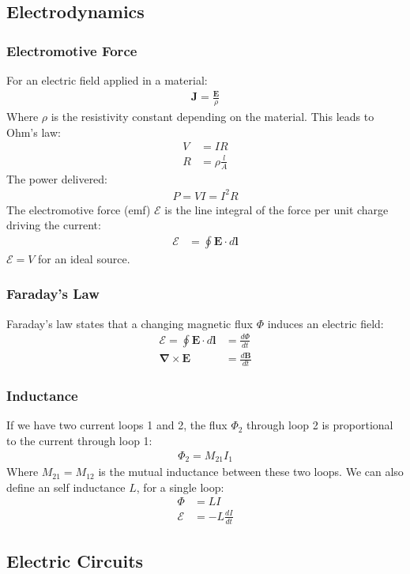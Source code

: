 \documentclass[11pt]{article}
\newcommand{\emf}{\mathcal{E}}	%
\newcommand{\ve}[1]{
  \ensuremath{\bm{#1}}}	               %
\begin{document}
\begin{multicols*}{3}
\subsection{Electrodynamics}
\subsubsection{Electromotive Force}
For an electric field applied in a material:
\begin{align*}
\ve{J} = \frac{\ve{E}}{\rho}
\end{align*}
Where $\rho$ is the resistivity constant depending on the material.
This leads to Ohm's law:
\begin{align*}
V&=IR\\
R&=\rho\frac{l}{A}
\end{align*}
The power delivered:
\begin{align*}
P=VI=I^2R
\end{align*}
The electromotive force (emf) $\emf$ is the line integral of the force per unit charge driving the current:
\begin{align*}
\emf &=\oint \ve{E} \cdot d\ve{l}
\end{align*}
$\emf=V$ for an ideal source.
\subsubsection{Faraday's Law}
Faraday's law states that a changing magnetic flux $\Phi$ induces an electric field:
\begin{align*}
\emf =\oint \ve{E} \cdot d\ve{l} &= \frac{d\Phi}{dt}\\
\ve{\nabla}\times\ve{E}&=\frac{d\ve{B}}{dt}
\end{align*}
\subsubsection{Inductance}
If we have two current loops 1 and 2, the flux $\Phi_2$ through loop 2 is proportional to the current through loop 1:
\begin{align*}
\Phi_2 = M_{21}I_1
\end{align*}
Where $M_{21}=M_{12}$ is the mutual inductance between these two loops. We can also define an self inductance $L$, for a single loop:
\begin{align*}
\Phi &= LI\\
\emf &= -L\frac{dI}{dt}
\end{align*}
\subsection{Electric Circuits}


\end{multicols*}
\end{document}
